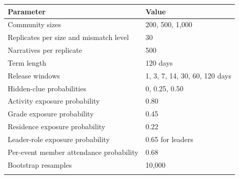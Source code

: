\documentclass[pdflatex,sn-mathphys-num]{sn-jnl}
\theoremstyle{plain}
\begin{document}
\begin{appendices}
\begin{center}
\small
\begin{tabular}{@{}ll@{}}
\toprule
Parameter & Value\\
\midrule
Community sizes & 200, 500, 1,000\\
Replicates per size and mismatch level & 30\\
Narratives per replicate & 500\\
Term length & 120 days\\
Release windows & 1, 3, 7, 14, 30, 60, 120 days\\
Hidden-clue probabilities & 0, 0.25, 0.50\\
Activity exposure probability & 0.80\\
Grade exposure probability & 0.45\\
Residence exposure probability & 0.22\\
Leader-role exposure probability & 0.65 for leaders\\
Per-event member attendance probability & 0.68\\
Bootstrap resamples & 10,000\\
\botrule
\end{tabular}
\end{center}

\end{appendices}
\end{document}
